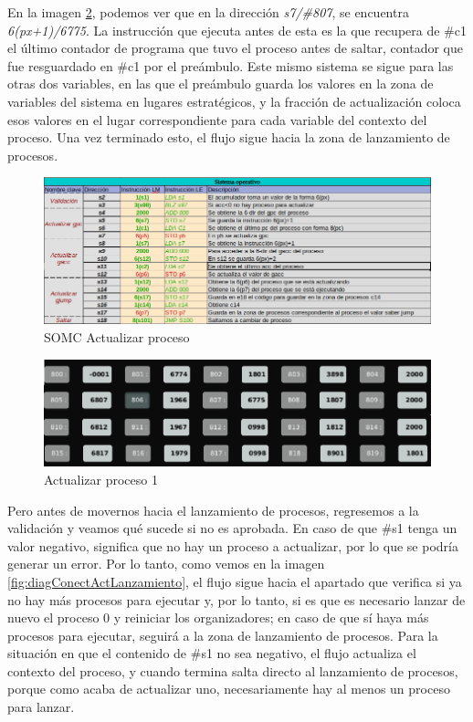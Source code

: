 \documentclass[letterpaper,12pt,oneside]{book}
\begin{document}
        En la imagen \ref{fig:Proceso1ActualizarP1}, podemos ver que en la dirección \textit{s7/\#807}, se encuentra \textit{6(px+1)/6775}. La
		instrucción que ejecuta antes de esta es la que recupera de \#c1 el último contador de programa que tuvo el proceso 
		antes de saltar, contador que
		fue resguardado en \#c1 por el preámbulo. Este mismo sistema se sigue para las otras dos variables, en las que el preámbulo guarda los valores
		en la zona de variables del sistema en lugares estratégicos, y la fracción de actualización  coloca esos valores en el lugar correspondiente
		para cada variable del contexto del proceso. Una vez terminado esto, el flujo sigue hacia la zona de lanzamiento de procesos.
		
		
		\begin{figure}[ht]		
			\centering
			\includegraphics[scale=0.55]{media/CARDIACC/SO_ActualizarProceso.png}
			\caption{ SOMC Actualizar proceso }
			\label{fig:somcActualizarProceso1}
		\end{figure}		
		
		
		\begin{figure}[ht]		
			\centering
			\includegraphics[scale=0.45]{media/CARDIACC/Proceso1ActualizarP1.png}
			\caption{ Actualizar proceso 1}
			\label{fig:Proceso1ActualizarP1}
		\end{figure}		
		
		
		Pero antes de movernos hacia el lanzamiento de procesos, regresemos a la validación y veamos qué sucede si no es aprobada.
		En caso de que \#s1 tenga 
		un valor negativo, 
		significa
		que no hay un proceso a actualizar, por lo que se podría generar un error. Por lo tanto, como vemos en la imagen 
		\ref{fig:diagConectActLanzamiento},
		el flujo sigue hacia el apartado que verifica si  ya no hay más procesos para ejecutar y, por lo tanto, si es que es necesario lanzar 
		de nuevo el proceso
		0 y reiniciar los organizadores; en caso de que sí haya más procesos para ejecutar, seguirá a la zona de lanzamiento de procesos. Para la 
		situación en que 
		el contenido de \#s1 no sea negativo, 
        el flujo actualiza el contexto del proceso, y cuando termina salta
        directo al lanzamiento de procesos, porque
		como acaba de actualizar uno, necesariamente hay al menos un proceso para lanzar.
		
\end{document}
